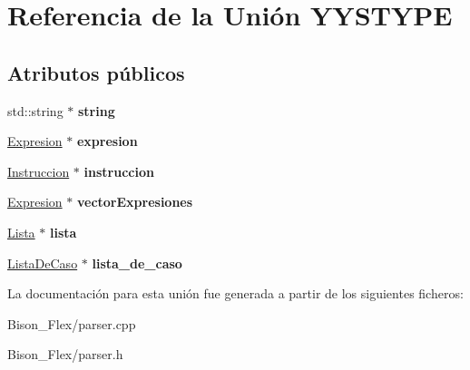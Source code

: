\hypertarget{union_y_y_s_t_y_p_e}{\section{Referencia de la Unión Y\-Y\-S\-T\-Y\-P\-E}
\label{union_y_y_s_t_y_p_e}
}
\subsection*{Atributos públicos}
\begin{DoxyCompactItemize}
\item 
\hypertarget{union_y_y_s_t_y_p_e_aa194a6d7eb96a0154e5628da125c97a6}{std\-::string $\ast$ {\bfseries string}}\label{union_y_y_s_t_y_p_e_aa194a6d7eb96a0154e5628da125c97a6}

\item 
\hypertarget{union_y_y_s_t_y_p_e_afb130aff6366ea0ab29e2e81911d1cc0}{\hyperlink{class_expresion}{Expresion} $\ast$ {\bfseries expresion}}\label{union_y_y_s_t_y_p_e_afb130aff6366ea0ab29e2e81911d1cc0}

\item 
\hypertarget{union_y_y_s_t_y_p_e_ae12f9c1d77de1e2baab51e34beee184d}{\hyperlink{class_instruccion}{Instruccion} $\ast$ {\bfseries instruccion}}\label{union_y_y_s_t_y_p_e_ae12f9c1d77de1e2baab51e34beee184d}

\item 
\hypertarget{union_y_y_s_t_y_p_e_a7a68c3e423c3681b36099911b2d9eb8c}{\hyperlink{class_expresion}{Expresion} $\ast$ {\bfseries vector\-Expresiones}}\label{union_y_y_s_t_y_p_e_a7a68c3e423c3681b36099911b2d9eb8c}

\item 
\hypertarget{union_y_y_s_t_y_p_e_a161149f5cffe4f3fb03a718f9184bdbb}{\hyperlink{class_lista}{Lista} $\ast$ {\bfseries lista}}\label{union_y_y_s_t_y_p_e_a161149f5cffe4f3fb03a718f9184bdbb}

\item 
\hypertarget{union_y_y_s_t_y_p_e_a11b6ae6e5f4fe4de2f3f3eae94db28e5}{\hyperlink{class_lista_de_caso}{Lista\-De\-Caso} $\ast$ {\bfseries lista\-\_\-de\-\_\-caso}}\label{union_y_y_s_t_y_p_e_a11b6ae6e5f4fe4de2f3f3eae94db28e5}

\end{DoxyCompactItemize}


La documentación para esta unión fue generada a partir de los siguientes ficheros\-:\begin{DoxyCompactItemize}
\item 
Bison\-\_\-\-Flex/parser.\-cpp\item 
Bison\-\_\-\-Flex/parser.\-h\end{DoxyCompactItemize}
